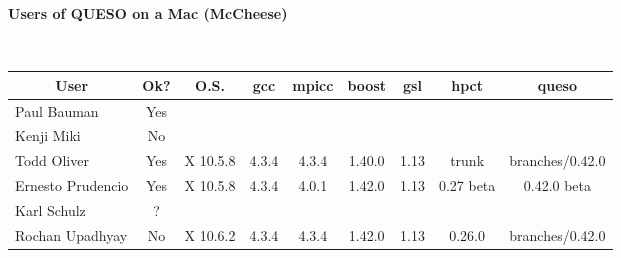 \documentclass[12pt,letterpaper,twoside,onecolumn,portrait,leqno]{book}
\begin{document}
\setlength{\unitlength}{1.0in}
\setlength{\parindent}{0cm}
\setlength{\parskip}{2ex}
\thispagestyle{empty}

\centerline{\bf Users of QUESO on a Mac (McCheese)}

$~$\\

\begin{table}[!h]
\begin{center}
\begin{tabular}{|l|c|c|c|c|c|c|c|c|}
\hline
\multicolumn{1}{|c|}{User} & Ok? & O.S.     & gcc    & mpicc   & boost  & gsl   & hpct      & queso       \\
\hline
\hline
Paul Bauman                & Yes &          &        &         &        &       &           &             \\
\hline
Kenji Miki                 & No  &          &        &         &        &       &           &             \\
\hline
Todd Oliver                & Yes & X 10.5.8 & 4.3.4  & 4.3.4   & 1.40.0 & 1.13  & trunk     & branches/0.42.0      \\
\hline
Ernesto Prudencio          & Yes & X 10.5.8 & 4.3.4  & 4.0.1   & 1.42.0 & 1.13  & 0.27 beta & 0.42.0 beta \\
\hline
Karl Schulz                & ?   &          &        &         &        &       &           &             \\
\hline
Rochan Upadhyay            & No  & X 10.6.2 & 4.3.4  & 4.3.4   & 1.42.0 & 1.13  & 0.26.0    & branches/0.42.0 \\
\hline
\end{tabular}
\end{center}
\end{table}
\end{document}

